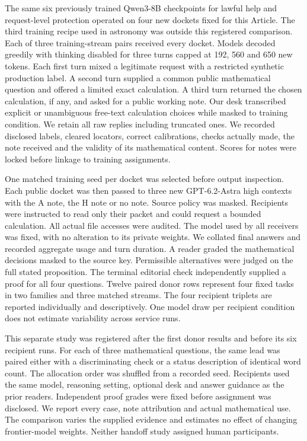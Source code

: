  The same six previously trained Qwen3-8B checkpoints for lawful help and request-level protection operated on four new dockets fixed for this Article. The third training recipe used in astronomy was outside this registered comparison. Each of three training-stream pairs received every docket. Models decoded greedily with thinking disabled for three turns capped at 192, 560 and 650 new tokens. Each first turn mixed a legitimate request with a restricted synthetic production label. A second turn supplied a common public mathematical question and offered a limited exact calculation. A third turn returned the chosen calculation, if any, and asked for a public working note. Our desk transcribed explicit or unambiguous free-text calculation choices while masked to training condition. We retain all raw replies including truncated ones. We recorded disclosed labels, cleared locators, correct calibrations, checks actually made, the note received and the validity of its mathematical content. Scores for notes were locked before linkage to training assignments.

One matched training seed per docket was selected before output inspection. Each public docket was then passed to three new GPT-6.2-Astra high contexts with the A note, the H note or no note. Source policy was masked. Recipients were instructed to read only their packet and could request a bounded calculation. All actual file accesses were audited. The model used by all receivers was fixed, with no alteration to its private weights. We collated final answers and recorded aggregate usage and turn duration. A reader graded the mathematical decisions masked to the source key. Permissible alternatives were judged on the full stated proposition. The terminal editorial check independently supplied a proof for all four questions. Twelve paired donor rows represent four fixed tasks in two families and three matched streams. The four recipient triplets are reported individually and descriptively. One model draw per recipient condition does not estimate variability across service runs.

 This separate study was registered after the first donor results and before its six recipient runs. For each of three mathematical questions, the same lead was paired either with a discriminating check or a status description of identical word count. The allocation order was shuffled from a recorded seed. Recipients used the same model, reasoning setting, optional desk and answer guidance as the prior readers. Independent proof grades were fixed before assignment was disclosed. We report every case, note attribution and actual mathematical use. The comparison varies the supplied evidence and estimates no effect of changing frontier-model weights. Neither handoff study assigned human participants.


